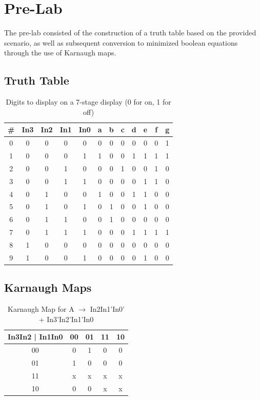 \documentclass[
	letterpaper, %
	10pt, %
]{CSUniSchoolLabReport}
\begin{document}
\section{Pre-Lab}

The pre-lab consisted of the construction of a truth table based on the provided scenario, as well as subsequent conversion to minimized boolean equations through the use of Karnaugh maps.

\subsection{Truth Table}

\begin{table}[H]
  \centering
  \begin{tabular}{| c || c | c | c | c || c | c | c | c | c | c | c |}
    \hline
    \# & In3 & In2 & In1 & In0 & a & b & c & d & e & f & g \\
    \hline
    0 & 0 & 0 & 0 & 0 & 0 & 0 & 0 & 0 & 0 & 0 & 1 \\
    \hline 
    1 & 0 & 0 & 0 & 1 & 1 & 0 & 0 & 1 & 1 & 1 & 1 \\
    \hline
    2 & 0 & 0 & 1 & 0 & 0 & 0 & 1 & 0 & 0 & 1 & 0 \\
    \hline
    3 & 0 & 0 & 1 & 1 & 0 & 0 & 0 & 0 & 1 & 1 & 0\\
    \hline
    4 & 0 & 1 & 0 & 0 & 1 & 0 & 0 & 1 & 1 & 0 & 0\\
    \hline
    5 & 0 & 1 & 0 & 1 & 0 & 1 & 0 & 0 & 1 & 0 & 0\\
    \hline
    6 & 0 & 1 & 1 & 0 & 0 & 1 & 0 & 0 & 0 & 0 & 0\\
    \hline
    7 & 0 & 1 & 1 & 1 & 0 & 0 & 0 & 1 & 1 & 1 & 1\\
    \hline
    8 & 1 & 0 & 0 & 0 & 0 & 0 & 0 & 0 & 0 & 0 & 0\\
    \hline
    9 & 1 & 0 & 0 & 1 & 0 & 0 & 0 & 0 & 1 & 0 & 0\\
    \hline
  \end{tabular}
  \caption{Digits to display on a 7-stage display (0 for on, 1 for off)}
  \label{tab:1}
\end{table}

\subsection{Karnaugh Maps}

    \begin{table}[H]
      \centering
      \begin{tabular}{|c | c | c | c | c |}
        \hline
        In3In2 | In1In0 & 00 & 01 & 11 & 10\\
        \hline
        00 & 0 & 1 & 0 & 0\\
        \hline
        01 & 1 & 0 & 0 & 0\\
        \hline
        11 & x & x & x & x\\
        \hline
        10 & 0 & 0 & x & x\\
        \hline
      \end{tabular}
      \caption{Karnaugh Map for A $\rightarrow$ In2In1'In0' + In3'In2'In1'In0}
      \label{tab:2}
    \end{table}
\end{document}
